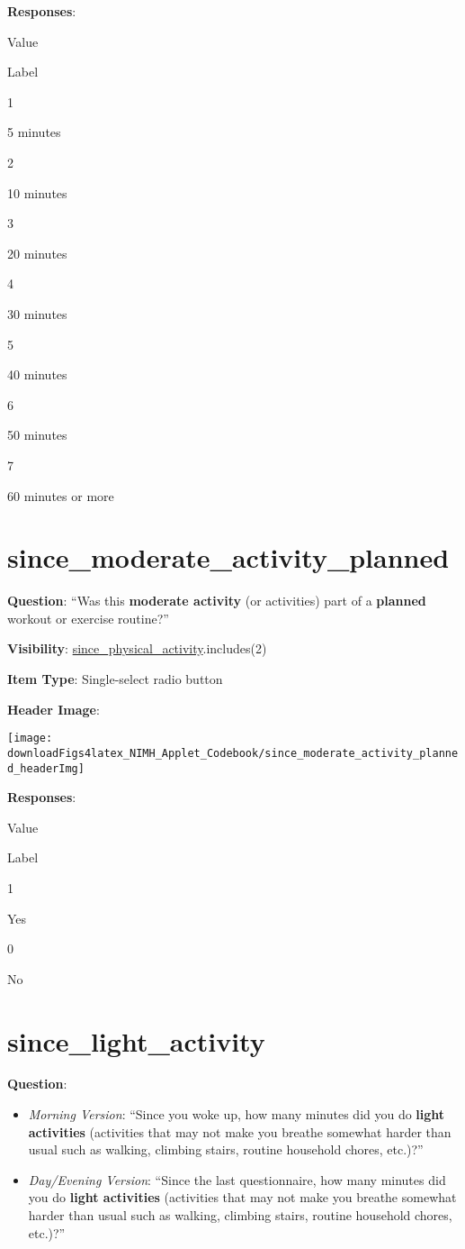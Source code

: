 \documentclass[]{book}
\providecommand{\tightlist}{%
  \setlength{\itemsep}{0pt}\setlength{\parskip}{0pt}}
\begin{document}
\textbf{Responses}:

Value

Label

1

5 minutes

2

10 minutes

3

20 minutes

4

30 minutes

5

40 minutes

6

50 minutes

7

60 minutes or more

\hypertarget{since_moderate_activity_planned}{%
\section{since\_moderate\_activity\_planned}\label{since_moderate_activity_planned}}

\textbf{Question}: ``Was this \textbf{moderate activity} (or activities) part of a \textbf{planned} workout or exercise routine?''

\textbf{Visibility}: \protect\hyperlink{since_physical_activity}{since\_physical\_activity}.includes(2)

\textbf{Item Type}: Single-select radio button

\textbf{Header Image}:

\begin{flushleft}\texttt{[image: downloadFigs4latex\_NIMH\_Applet\_Codebook/since\_moderate\_activity\_planned\_headerImg]} \end{flushleft}

\textbf{Responses}:

Value

Label

1

Yes

0

No

\hypertarget{since_light_activity}{%
\section{since\_light\_activity}\label{since_light_activity}}

\textbf{Question}:

\begin{itemize}
\tightlist
\item
  \emph{Morning Version}: ``Since you woke up, how many minutes did you do \textbf{light activities} (activities that may not make you breathe somewhat harder than usual such as walking, climbing stairs, routine household chores, etc.)?''
\item
  \emph{Day/Evening Version}: ``Since the last questionnaire, how many minutes did you do \textbf{light activities} (activities that may not make you breathe somewhat harder than usual such as walking, climbing stairs, routine household chores, etc.)?''
\end{itemize}
\end{document}
